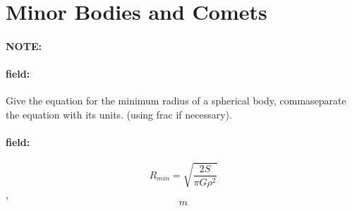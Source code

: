 \documentclass[12pt]{article}
\newenvironment{note}{\paragraph{NOTE:}}{}
\newenvironment{field}{\paragraph{field:}}{}
\begin{document}
\section{Minor Bodies and Comets}
\begin{note}
   \begin{field}
       Give the equation for the minimum radius of a spherical body, commaseparate the equation with its units. (using frac if necessary).
   \end{field}
   \begin{field}
		\[
			R_{min}=\sqrt{\frac{2S}{\pi G \rho^2}}
		\],
		\[
			m
		\]
   \end{field}
\end{note}
\end{document}
